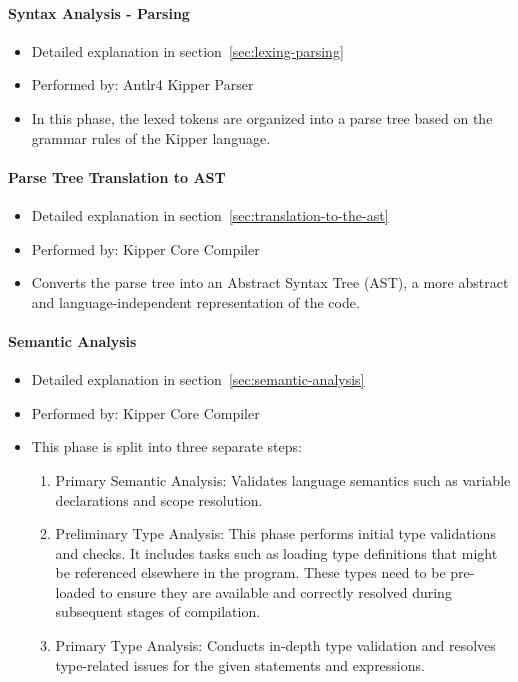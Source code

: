 \paragraph{Syntax Analysis - Parsing}
\begin{itemize}
	\item Detailed explanation in section~\ref{sec:lexing-parsing}
	\item Performed by: Antlr4 Kipper Parser
	\item In this phase, the lexed tokens are organized into a parse tree based on the grammar rules of the Kipper language.
\end{itemize}

\paragraph{Parse Tree Translation to AST}
\begin{itemize}
	\item Detailed explanation in section~\ref{sec:translation-to-the-ast}
	\item Performed by: Kipper Core Compiler
	\item Converts the parse tree into an Abstract Syntax Tree (AST), a more abstract and language-independent representation of the code.
\end{itemize}

\paragraph{Semantic Analysis}
\begin{itemize}
	\item Detailed explanation in section~\ref{sec:semantic-analysis}
	\item Performed by: Kipper Core Compiler
	\item This phase is split into three separate steps:
	\begin{enumerate}
		\item Primary Semantic Analysis: Validates language semantics such as variable declarations and scope resolution.
		\item Preliminary Type Analysis: This phase performs initial type validations and checks. It includes tasks such as loading type definitions that might be referenced elsewhere in the program. These types need to be pre-loaded to ensure they are available and correctly resolved during subsequent stages of compilation.
		\item Primary Type Analysis: Conducts in-depth type validation and resolves type-related issues for the given statements and expressions.
	\end{enumerate}
\end{itemize}


